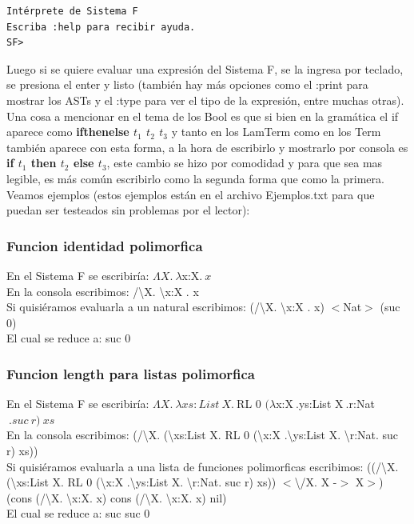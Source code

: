 \documentclass[12pt, titlepage, a4paper]{article}
\begin{document}
\begin{verbatim}
Intérprete de Sistema F
Escriba :help para recibir ayuda.
SF>
\end{verbatim}

Luego si se quiere evaluar una expresión del Sistema F, se la ingresa por teclado, se presiona el enter y listo 
(también hay más opciones como el :print para mostrar los ASTs y el :type para ver el tipo de la expresión, entre muchas otras). \\

Una cosa a mencionar en el tema de los Bool es que si bien en la gramática el if aparece como \textbf{ifthenelse $t_1$ $t_2$ $t_3$} y 
tanto en los LamTerm como en los Term también aparece con esta forma, a la hora de escribirlo y mostrarlo por consola es 
\textbf{if $t_1$ then $t_2$ else $t_3$}, este cambio se hizo por comodidad y para que sea mas legible, es más común escribirlo como la segunda forma que como 
la primera.\\

Veamos ejemplos (estos ejemplos están en el archivo Ejemplos.txt para que puedan ser testeados sin problemas por el lector):

\subsubsection{Funcion identidad polimorfica}
\noindent En el Sistema F se escribiría: $\Lambda X.\ \lambda $x:X$. \ x$ \\
En la consola escribimos: /\textbackslash X. \textbackslash x:X . x \\
Si quisiéramos evaluarla a un natural escribimos: (/\textbackslash X. \textbackslash x:X . x)  $<$Nat$>$ (suc 0) \\
El cual se reduce a: suc 0

\subsubsection{Funcion length para listas polimorfica}
\noindent En el Sistema F se escribiría: $\Lambda X.\ \lambda xs:List \ X. \ $RL 0 $(\lambda $x:X$ \ .$ys:List X$ \ .$r:Nat$\ .suc\ r)\ xs$ \\
En la consola escribimos: (/\textbackslash X. (\textbackslash xs:List X. RL 0 (\textbackslash x:X .\textbackslash ys:List X. \textbackslash r:Nat. suc r) xs)) \\
Si quisiéramos evaluarla a una lista de funciones polimorficas escribimos: 
((/\textbackslash X. (\textbackslash xs:List X. RL 0 (\textbackslash x:X .\textbackslash ys:List X. \textbackslash r:Nat. suc r) xs)) $<$\textbackslash/X. X -$>$ X$>$) 
(cons (/\textbackslash X. \textbackslash x:X. x) cons (/\textbackslash X. \textbackslash x:X. x) nil)\\
El cual se reduce a: suc suc 0 \\
\end{document}
